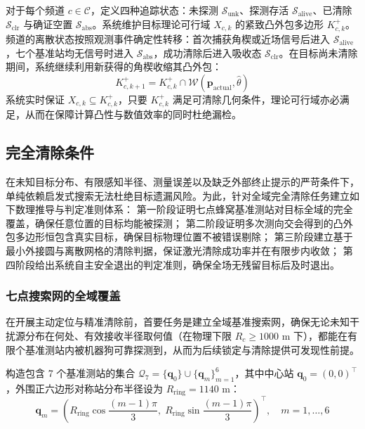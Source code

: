 \documentclass[zihao=-4,a4paper,UTF8]{ctexart}
\begin{document}
对于每个频道 $c \in \mathcal{C}$，定义四种追踪状态：未探测 $\mathcal{S}_{\mathrm{unk}}$、探测存活 $\mathcal{S}_{\mathrm{alive}}$、已清除 $\mathcal{S}_{\mathrm{clr}}$ 与确证空置 $\mathcal{S}_{\mathrm{abs}}$。系统维护目标理论可行域 $X_{c, k}$ 的紧致凸外包多边形 $K_{c, k}^+$。频道的离散状态按照观测事件确定性转移：首次捕获角楔或近场信号后进入 $\mathcal{S}_{\mathrm{alive}}$，七个基准站均无信号时进入 $\mathcal{S}_{\mathrm{abs}}$，成功清除后进入吸收态 $\mathcal{S}_{\mathrm{clr}}$。在目标尚未清除期间，系统继续利用新获得的角楔收缩其凸外包：
\begin{equation}
    K_{c, k+1}^+ = K_{c, k}^+ \cap \mathcal{W}(\mathbf{p}_{\mathrm{actual}}, \hat{\theta})
\end{equation}
系统实时保证 $X_{c, k} \subseteq K_{c, k}^+$，只要 $K_{c, k}^+$ 满足可清除几何条件，理论可行域亦必满足，从而在保障计算凸性与数值效率的同时杜绝漏检。

\subsection{完全清除条件}

在未知目标分布、有限感知半径、测量误差以及缺乏外部终止提示的严苛条件下，单纯依赖启发式搜索无法杜绝目标遗漏风险。为此，针对全域完全清除任务建立如下数理推导与判定准则体系：
第一阶段证明七点蜂窝基准测站对目标全域的完全覆盖，确保任意位置的目标均能被探测；
第二阶段证明多次测向交会得到的凸外包多边形恒包含真实目标，确保目标物理位置不被错误剔除；
第三阶段建立基于最小外接圆与离散网格的清除判据，保证激光清除成功率并在有限步内收敛；
第四阶段给出系统自主安全退出的判定准则，确保全场无残留目标后及时退出。

\subsubsection{七点搜索网的全域覆盖}

在开展主动定位与精准清除前，首要任务是建立全域基准搜索网，确保无论未知干扰源分布在何处、有效接收半径取何值（在物理下限 $R_c \ge 1000\text{ m}$ 下），都能在有限个基准测站内被机器狗可靠探测到，从而为后续锁定与清除提供可发现性前提。

构造包含 7 个基准测站的集合 $\mathcal{Q}_7 = \{\mathbf{q}_0\} \cup \{\mathbf{q}_m\}_{m=1}^6$，其中中心站 $\mathbf{q}_0=(0,0)^\top$，外围正六边形对称站分布半径设为 $R_{\mathrm{ring}} = 1140\text{ m}$：
\begin{equation}
    \mathbf{q}_m = \left( R_{\mathrm{ring}}\cos\frac{(m-1)\pi}{3},\; R_{\mathrm{ring}}\sin\frac{(m-1)\pi}{3} \right)^\top, \quad m = 1, \dots, 6
\end{equation}
\end{document}
